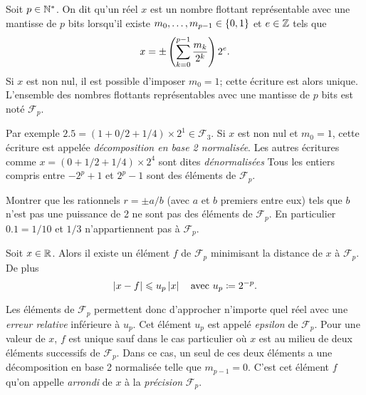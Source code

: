 \documentclass{magnolia}
\begin{document}


\begin{definition}
Soit $p\in{\mathbb{N}^*}$. On dit qu'un réel $x$ est un nombre flottant représentable avec une mantisse de $p$ bits lorsqu'il existe $m_0,\ldots,m_{p-1}\in\left\{0,1\right\}$ et $e\in\mathbb{Z}$ tels que
\[x=\pm\left(\sum_{k=0}^{p-1} \frac{m_k}{2^k}\right)2^e.\]
Si $x$ est non nul, il est possible d'imposer $m_0=1$; cette écriture est alors unique. L'ensemble des nombres flottants représentables avec une mantisse de $p$ bits est noté $\mathcal{F}_p$.  
\end{definition}

\begin{remarques}
\remarque 
  Par exemple $2.5=(1+0/2+1/4)\times 2^1\in\mathcal{F}_3$.
\remarque Si $x$ est non nul et $m_0=1$, cette écriture est appelée
  \emph{décomposition en base 2 normalisée}. Les autres écritures comme
  $x = (0 + 1/2 + 1/4)\times 2^4$ sont dites \emph{dénormalisées}
\remarque Tous les entiers compris entre $-2^p+1$ et $2^p-1$ sont des éléments de $\mathcal{F}_p$.
\end{remarques}

\begin{exoUnique}
\exo Montrer que les rationnels $r=\pm a/b$ (avec $a$ et $b$ premiers entre eux) tels que $b$ n'est pas une puissance de 2 ne sont pas des éléments de $\mathcal{F}_p$. En particulier $0.1=1/10$ et $1/3$ n'appartiennent pas à $\mathcal{F}_p$.
\end{exoUnique}



\begin{proposition}
  Soit $x\in\mathbb{R}$. Alors il existe un élément $f$ de $\mathcal{F}_p$ minimisant la distance de $x$ à $\mathcal{F}_p$. De plus
  \[\left|x-f\right|\leqslant u_p\left|x\right| \quad\text{avec $u_p\coloneqq 2^{-p}$}.\]
  \end{proposition}

\begin{remarques}
\remarque Les éléments de $\mathcal{F}_p$ permettent donc d'approcher
  n'importe quel réel avec une \emph{erreur relative} inférieure à $u_p$. Cet
  élément $u_p$ est appelé \emph{epsilon} de $\mathcal{F}_p$.
\remarque Pour une valeur de $x$, $f$ est unique sauf dans le cas particulier où $x$
  est au milieu de deux éléments successifs de $\mathcal{F}_p$. Dans ce cas, un seul de
  ces deux éléments a une décomposition en base 2 normalisée telle que $m_{p-1}=0$.
  C'est cet élément $f$ qu'on appelle \emph{arrondi} de $x$ à la \emph{précision}
  $\mathcal{F}_p$.
\end{remarques}
\end{document}
